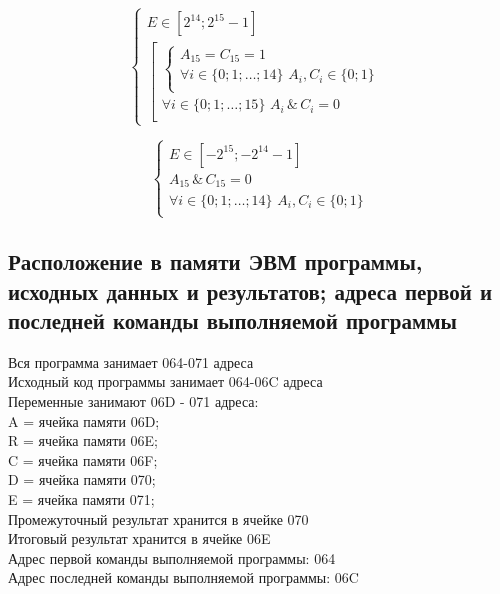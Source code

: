 \begin{center}
\[
\begin{cases}
E \in [2^{14}; 2^{15} - 1] \\
\left[
\begin{array}{l}
\begin{cases}
A_{15} = C_{15} = 1 \\
\forall i \in \{0; 1; \dots; 14\}\,\, A_{i}, C_{i} \in \{0; 1\} \\
\end{cases} \\
\forall i \in \{0; 1; \dots; 15\}\,\, A_{i}\, \&\, C_{i} = 0 \\
\end{array}
\right.
\end{cases}
\]
\end{center}
\[
\begin{cases}
E \in [-2^{15}; -2^{14} - 1] \\
A_{15}\, \& \, C_{15} = 0 \\
\forall i \in \{0; 1; \dots; 14\}\,\, A_{i}, C_{i} \in \{0; 1\} \\
\end{cases}
\]

\subsection{Расположение в памяти ЭВМ программы, исходных данных и результатов; адреса первой и последней команды выполняемой программы} 
Вся программа занимает 064-071 адреса \\
Исходный код программы занимает 064-06C адреса \\
Переменные занимают 06D - 071 адреса: \\
A = ячейка памяти 06D; \\
R = ячейка памяти 06E; \\
C = ячейка памяти 06F; \\
D = ячейка памяти 070; \\
E = ячейка памяти 071; \\
Промежуточный результат хранится в ячейке 070 \\
Итоговый результат хранится в ячейке 06E \\

\noindent Адрес первой команды выполняемой программы: 064 \\
Адрес последней команды выполняемой программы: 06C
